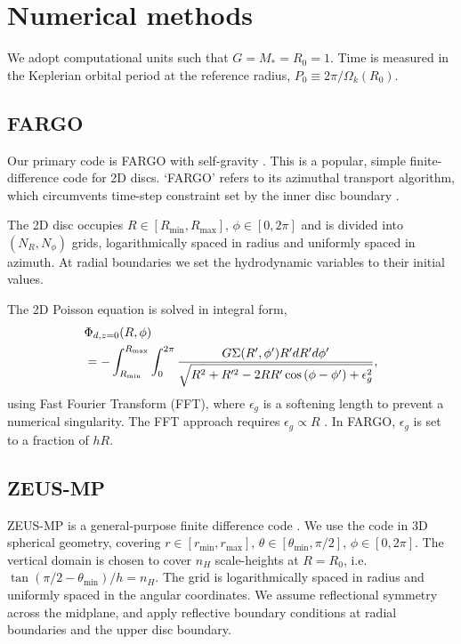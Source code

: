 \section{Numerical methods}\label{methods}
We adopt computational units such that $G=M_*=R_0=1$. Time is measured
in the Keplerian orbital period at the reference radius, $P_0\equiv 
2\pi/\Omega_k(R_0)$.  

\subsection{FARGO}
Our primary code is FARGO with self-gravity \citep{baruteau08}. This
is a popular, simple finite-difference code for 2D discs. `FARGO' refers
to its azimuthal transport algorithm, which circumvents time-step
constraint set by the inner disc boundary \citep{masset00a,masset00b}. 

The 2D disc occupies
$R\in[R_\mathrm{min},R_\mathrm{max}],\,\phi\in[0,2\pi]$ and is 
divided into $(N_R,N_\phi)$ grids, logarithmically spaced in radius and
uniformly spaced in azimuth. At radial boundaries we set the
hydrodynamic variables to their initial values.   

The 2D Poisson equation is solved in integral form, 
\begin{align}\label{2d_grav}
  &\Phi_{d,z=0}(R,\phi) \notag \\
  &=-\int_{R_\mathrm{min}}^{R_\mathrm{max}} \int_0^{2\pi}
  \frac{G\Sigma(R^\prime,\phi^\prime)R^\prime dR^\prime d\phi^\prime}{\sqrt{R^2+R^{\prime 2} -
      2RR^\prime\cos{(\phi - \phi^\prime)} + \epsilon_g^2}}, 
\end{align}
using Fast Fourier Transform (FFT), where $\epsilon_g$ is a softening
length to prevent a numerical singularity. The FFT approach requires
$\epsilon_g\propto R$ \citep{baruteau08}. In FARGO, $\epsilon_g$ is
set to a fraction of $hR$.  

\subsection{ZEUS-MP}
ZEUS-MP  is a general-purpose finite difference
code \citep{hayes06}. We use the code in 3D spherical geometry, covering
$r\in[r_\mathrm{min},r_\mathrm{max}]$, $\theta\in[\theta_\mathrm{min},\pi/2]$,
$\phi\in[0,2\pi]$. The vertical domain is chosen to cover $n_H$
scale-heights at $R=R_0$, i.e. $\tan{(\pi/2 - \theta_\mathrm{min})}/h=n_H$. 
The grid is logarithmically spaced in radius and uniformly spaced in the angular
coordinates. We assume reflectional symmetry across the midplane, and
apply reflective boundary conditions at radial boundaries and the
upper disc boundary.  

